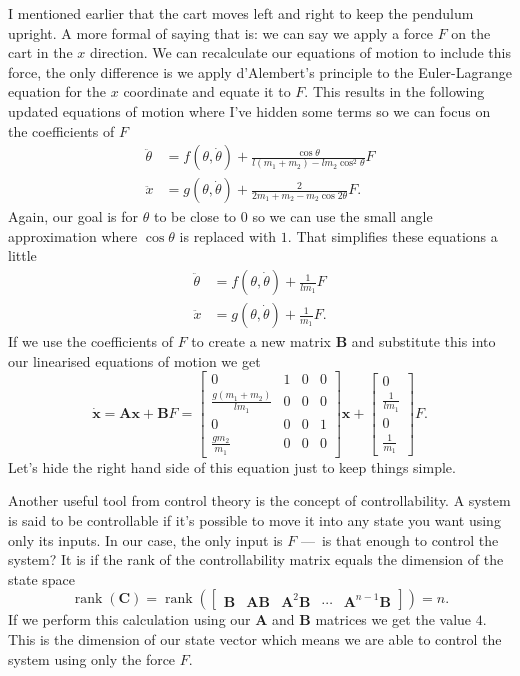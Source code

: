 \documentclass{article}
\DeclareMathOperator{\rank}{rank}
\renewcommand{\vec}[1]{\boldsymbol{\mathbf{#1}}}
\newcommand{\dvec}[1]{\dot{\vec{#1}}}
\begin{document}
I mentioned earlier that the cart moves left and right to keep the pendulum upright. A more formal of saying that is: we can say we apply a force $F$ on the cart in the $x$ direction. We can recalculate our equations of motion to include this force, the only difference is we apply d'Alembert's principle to the Euler-Lagrange equation for the $x$ coordinate and equate it to $F$. This results in the following updated equations of motion where I've hidden some terms so we can focus on the coefficients of $F$ \begin{align*}
  \ddot{\theta} & = f(\theta, \dot{\theta}) + \frac{\cos \theta}{l (m_1 + m_2) - l m_2 \cos^2 \theta} F \\
  \ddot{x}      & = g(\theta, \dot{\theta}) + \frac{2}{2 m_1 + m_2 - m_2 \cos 2 \theta} F.
\end{align*} Again, our goal is for $\theta$ to be close to $0$ so we can use the small angle approximation where $\cos \theta$ is replaced with $1$. That simplifies these equations a little \begin{align*}
  \ddot{\theta} & = f(\theta, \dot{\theta}) + \frac{1}{l m_1} F \\
  \ddot{x}      & = g(\theta, \dot{\theta}) + \frac{1}{m_1} F.
\end{align*} If we use the coefficients of $F$ to create a new matrix $\vec{B}$ and substitute this into our linearised equations of motion we get \[\dvec{x} = \vec{A} \vec{x} + \vec{B} F = \begin{bmatrix}
    0                           & 1 & 0 & 0 \\
    \frac{g (m_1 + m_2)}{l m_1} & 0 & 0 & 0 \\
    0                           & 0 & 0 & 1 \\
    \frac{g m_2}{m_1}           & 0 & 0 & 0
  \end{bmatrix} \vec{x} + \begin{bmatrix}
    0               \\
    \frac{1}{l m_1} \\
    0               \\
    \frac{1}{m_1}
  \end{bmatrix} F.\] Let's hide the right hand side of this equation just to keep things simple.

Another useful tool from control theory is the concept of controllability. A system is said to be controllable if it's possible to move it into any state you want using only its inputs. In our case, the only input is $F$ — is that enough to control the system? It is if the rank of the controllability matrix equals the dimension of the state space \[\rank(\vec{C}) = \rank(\begin{bmatrix}
      \vec{B} & \vec{A} \vec{B} & \vec{A}^2 \vec{B} & \cdots & \vec{A}^{n - 1} \vec{B}
    \end{bmatrix}) = n.\] If we perform this calculation using our $\vec{A}$ and $\vec{B}$ matrices we get the value $4$. This is the dimension of our state vector which means we are able to control the system using only the force $F$.
\end{document}
